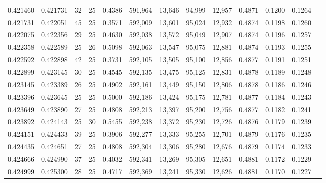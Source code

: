 \begin{tabular}{rrrrrrrrrrrrr}
0.421460 & 0.421731 &    32 &  25 &                                     0.4386 & 591,964 &  13,646 &  94,999 &  12,957 & 0.4871 & 0.1200 & 0.1264 \\
0.421731 & 0.422051 &    45 &  25 &                                     0.3571 & 592,009 &  13,601 &  95,024 &  12,932 & 0.4874 & 0.1198 & 0.1260 \\
0.422075 & 0.422356 &    29 &  25 &                                     0.4630 & 592,038 &  13,572 &  95,049 &  12,907 & 0.4874 & 0.1196 & 0.1257 \\
0.422358 & 0.422589 &    25 &  26 &                                     0.5098 & 592,063 &  13,547 &  95,075 &  12,881 & 0.4874 & 0.1193 & 0.1255 \\
0.422592 & 0.422898 &    42 &  25 &                                     0.3731 & 592,105 &  13,505 &  95,100 &  12,856 & 0.4877 & 0.1191 & 0.1251 \\
0.422899 & 0.423145 &    30 &  25 &                                     0.4545 & 592,135 &  13,475 &  95,125 &  12,831 & 0.4878 & 0.1189 & 0.1248 \\
0.423145 & 0.423389 &    26 &  25 &                                     0.4902 & 592,161 &  13,449 &  95,150 &  12,806 & 0.4878 & 0.1186 & 0.1246 \\
0.423396 & 0.423645 &    25 &  25 &                                     0.5000 & 592,186 &  13,424 &  95,175 &  12,781 & 0.4877 & 0.1184 & 0.1243 \\
0.423649 & 0.423890 &    27 &  25 &                                     0.4808 & 592,213 &  13,397 &  95,200 &  12,756 & 0.4877 & 0.1182 & 0.1241 \\
0.423892 & 0.424143 &    25 &  30 &                                     0.5455 & 592,238 &  13,372 &  95,230 &  12,726 & 0.4876 & 0.1179 & 0.1239 \\
0.424151 & 0.424433 &    39 &  25 &                                     0.3906 & 592,277 &  13,333 &  95,255 &  12,701 & 0.4879 & 0.1176 & 0.1235 \\
0.424435 & 0.424651 &    27 &  25 &                                     0.4808 & 592,304 &  13,306 &  95,280 &  12,676 & 0.4879 & 0.1174 & 0.1233 \\
0.424666 & 0.424990 &    37 &  25 &                                     0.4032 & 592,341 &  13,269 &  95,305 &  12,651 & 0.4881 & 0.1172 & 0.1229 \\
0.424999 & 0.425300 &    28 &  25 &                                     0.4717 & 592,369 &  13,241 &  95,330 &  12,626 & 0.4881 & 0.1170 & 0.1227 \\

\end{tabular}
